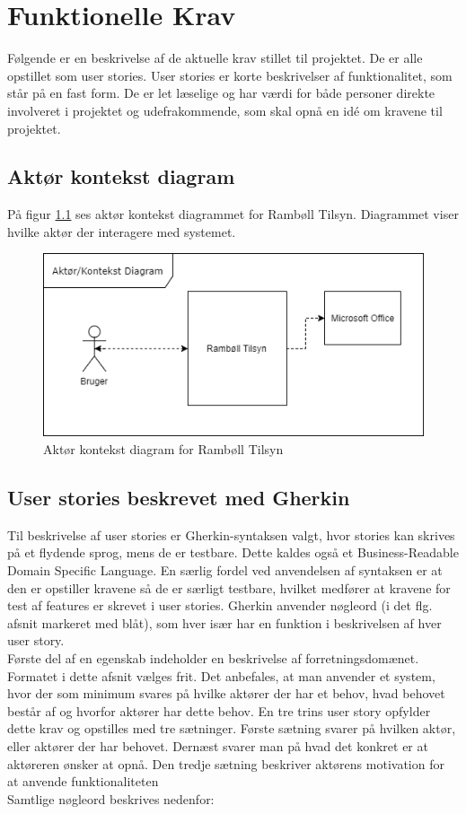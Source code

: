 \chapter{Funktionelle Krav} \label{sec:FunktionelleKrav}
Følgende er en beskrivelse af de aktuelle krav stillet til projektet. De er alle opstillet som user stories. User stories er korte beskrivelser af funktionalitet, som står på en fast form. De er let læselige og har værdi for både personer direkte involveret i projektet og udefrakommende, som skal opnå en idé om kravene til projektet. 

\section{Aktør kontekst diagram}\label{sec:Aktor}
	På figur \ref{fig:AktorKontekst} ses aktør kontekst diagrammet for Rambøll Tilsyn. Diagrammet viser hvilke aktør der interagere med systemet.
\begin{figure}[H]
	\centering
	\includegraphics[width=0.6\linewidth]{FunktionelleKrav/AktorDiagram}
	\caption{Aktør kontekst diagram for Rambøll Tilsyn}
	\label{fig:AktorKontekst}
\end{figure}


\section{User stories beskrevet med Gherkin}
Til beskrivelse af user stories er Gherkin-syntaksen valgt, hvor stories 
kan skrives på et flydende sprog, mens de er testbare.\cite{Gherkin} Dette kaldes også et Business-Readable Domain  
Specific Language. En særlig fordel ved anvendelsen af syntaksen er at den er opstiller kravene så de er særligt testbare, hvilket medfører at kravene for test af features er skrevet i user stories.
Gherkin anvender nøgleord (i det flg. afsnit 
markeret med blåt), som hver især har en funktion i beskrivelsen af hver 
user story.  \vspace{0.2 cm}\\
Første del af en egenskab indeholder en beskrivelse af forretningsdomænet. 
Formatet i	dette afsnit vælges frit. Det anbefales, at man anvender et 
system, hvor der som minimum svares på hvilke aktører der har et behov, hvad 
behovet består af og hvorfor aktører har dette behov. En tre trins user 
story opfylder dette krav og opstilles med tre 
sætninger. Første sætning svarer på hvilken aktør, eller aktører der har
behovet. Dernæst svarer man på hvad det konkret er at aktøreren ønsker at 
opnå. Den tredje sætning beskriver aktørens motivation for at anvende 
funktionaliteten\\
Samtlige nøgleord beskrives nedenfor:

